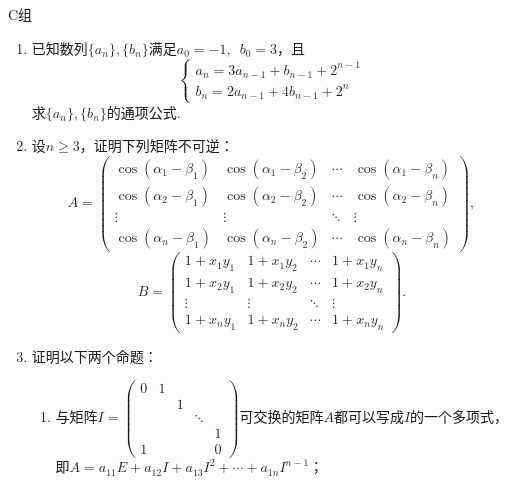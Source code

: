 \centerline{\heiti C组}
\begin{enumerate}
    \item 已知数列$\{a_n\},\{b_n\}$满足$a_0=-1,\enspace b_0=3$，且
          \[\begin{cases}
                  a_n=3a_{n-1}+b_{n-1}+2^{n-1} \\
                  b_n=2a_{n-1}+4b_{n-1}+2^n
              \end{cases}\]
          求$\{a_n\},\{b_n\}$的通项公式.

    \item 设$n\geqslant 3$，证明下列矩阵不可逆：
    \[A=\begin{pmatrix}
        \cos(\alpha_1-\beta_1) & \cos(\alpha_1-\beta_2) & \cdots & \cos(\alpha_1-\beta_n) \\
        \cos(\alpha_2-\beta_1) & \cos(\alpha_2-\beta_2) & \cdots & \cos(\alpha_2-\beta_n) \\
        \vdots & \vdots & \ddots & \vdots \\
        \cos(\alpha_n-\beta_1) & \cos(\alpha_n-\beta_2) & \cdots & \cos(\alpha_n-\beta_n)
    \end{pmatrix},\]
    \[B=\begin{pmatrix}
        1+x_1y_1 & 1+x_1y_2 & \cdots & 1+x_1y_n \\
        1+x_2y_1 & 1+x_2y_2 & \cdots & 1+x_2y_n \\
        \vdots & \vdots & \ddots & \vdots \\
        1+x_ny_1 & 1+x_ny_2 & \cdots & 1+x_ny_n
    \end{pmatrix}.\]

    \item 证明以下两个命题：
          \begin{enumerate}
              \item 与矩阵$I=\begin{pmatrix}
                            0 & 1 &   &        &   \\
                              &   & 1 &        &   \\
                              &   &   & \ddots &   \\
                              &   &   &        & 1 \\
                            1 &   &   &        & 0
                        \end{pmatrix}$可交换的矩阵$A$都可以写成$I$的一个多项式，即$A=a_{11}E+a_{12}I+a_{13}I^2+\cdots+a_{1n}I^{n-1}$；


\end{enumerate}
\end{enumerate}
